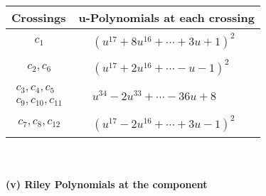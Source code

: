 \documentclass[1p]{elsarticle_modified}
\theoremstyle{definition}
\begin{document}
\begin{tabular}{m{50pt}|m{274pt}}
Crossings & \hspace{64pt}u-Polynomials at each crossing \\
\hline $$\begin{aligned}c_{1}\end{aligned}$$&$\begin{aligned}
&(u^{17}+8 u^{16}+\cdots+3 u+1)^{2}
\end{aligned}$\\
\hline $$\begin{aligned}c_{2},c_{6}\end{aligned}$$&$\begin{aligned}
&(u^{17}+2 u^{16}+\cdots- u-1)^{2}
\end{aligned}$\\
\hline $$\begin{aligned}c_{3},c_{4},c_{5}\\c_{9},c_{10},c_{11}\end{aligned}$$&$\begin{aligned}
&u^{34}-2 u^{33}+\cdots-36 u+8
\end{aligned}$\\
\hline $$\begin{aligned}c_{7},c_{8},c_{12}\end{aligned}$$&$\begin{aligned}
&(u^{17}-2 u^{16}+\cdots+3 u-1)^{2}
\end{aligned}$\\
\hline
\end{tabular}\\~\\
\newpage\renewcommand{\arraystretch}{1}
\flushleft \textbf{(v) Riley Polynomials at the component}\newline \\
\end{document}
